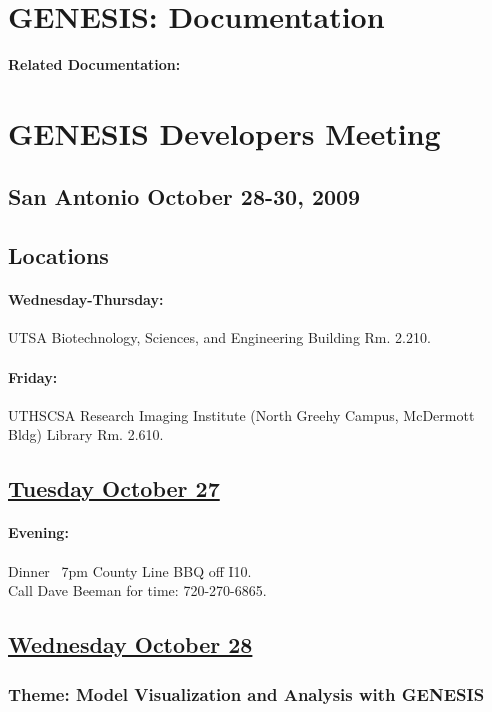 \documentclass[12pt]{article}
\begin{document}
\section*{GENESIS: Documentation}

{\bf Related Documentation:}

\section*{GENESIS Developers Meeting}

\subsection*{San Antonio October 28-30, 2009}

\subsection*{Locations}
\paragraph{\bf Wednesday-Thursday:} UTSA Biotechnology, Sciences, and Engineering Building Rm. 2.210.
\paragraph{\bf Friday:} UTHSCSA Research Imaging Institute (North Greehy Campus, McDermott Bldg) Library Rm. 2.610.

\subsection*{\underline{Tuesday October 27}}
\paragraph{\bf Evening:} Dinner ~7pm County Line BBQ off I10. \\
Call Dave Beeman for time: 720-270-6865.

\subsection*{\underline{Wednesday October 28}}
\subsubsection*{Theme: Model Visualization and Analysis with GENESIS}
\end{document}
